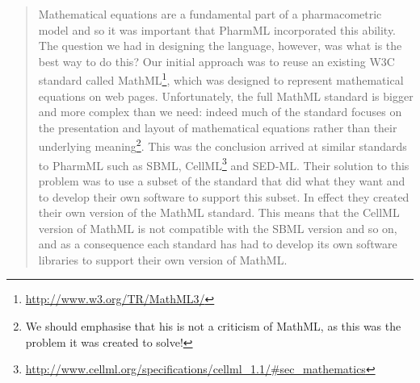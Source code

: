 \documentclass[a4paper,11pt]{article}
\newcommand{\sbml}{SBML\xspace}
\newcommand{\sedml}{SED-ML\xspace}
\newcommand{\mathml}{MathML\xspace}
\newcommand{\pharmml}{PharmML\xspace}
\begin{document}
\begin{quotation}
Mathematical equations are a fundamental part of a pharmacometric
model and so it was important that \pharmml incorporated this
ability. The question we had in designing the language, however, was
what is the best way to do this?  Our initial approach was to reuse an
existing W3C standard called
\mathml\footnote{\url{http://www.w3.org/TR/MathML3/}}, which was
designed to represent mathematical equations on web pages.
Unfortunately, the full \mathml standard is bigger and more complex
than we need: indeed much of the standard focuses on the presentation
and layout of mathematical equations rather than their underlying
meaning\footnote{We should emphasise that his is not a criticism of
  \mathml, as this was the problem it was created to solve!}.  This
was the conclusion arrived at similar standards to \pharmml such as
SBML,
CellML\footnote{\url{http://www.cellml.org/specifications/cellml_1.1/\#sec_mathematics}}
and \sedml. Their solution to this problem was to use
a subset of the standard that did what they want and to develop their
own software to support this subset. In effect they created their own
version of the \mathml standard. This means that the CellML version of
\mathml is not compatible with the \sbml version and so on, and as a
consequence each standard has had to develop its own software
libraries to support their own version of \mathml.


\end{quotation}
\end{document}
